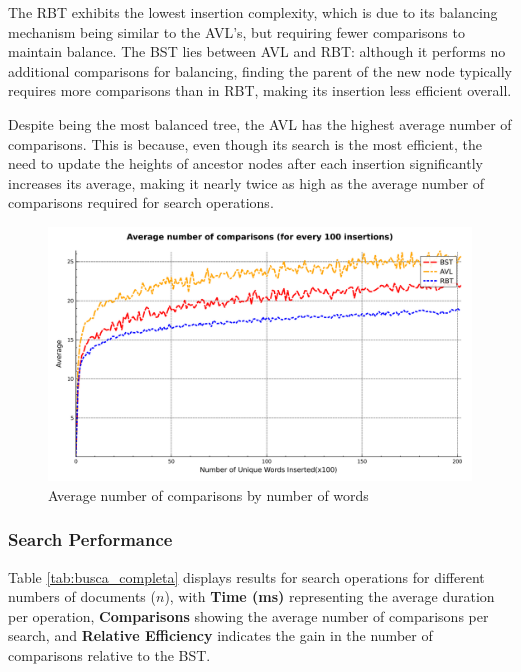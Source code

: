 The RBT exhibits the lowest insertion complexity, which is due to its balancing mechanism being similar to the AVL's, but requiring fewer comparisons to maintain balance. The BST lies between AVL and RBT: although it performs no additional comparisons for balancing, finding the parent of the new node typically requires more comparisons than in RBT, making its insertion less efficient overall.

Despite being the most balanced tree, the AVL has the highest average number of comparisons. This is because, even though its search is the most efficient, the need to update the heights of ancestor nodes after each insertion significantly increases its average, making it nearly twice as high as the average number of comparisons required for search operations.

\begin{figure}[H]
     \centering
     \includegraphics[width=0.8\linewidth]{img/Graph_3_20273.pdf}
     \caption{Average number of comparisons by number of words}
     \label{fig:mean-log}
\end{figure}


 \subsubsection{Search Performance}

 Table \ref{tab:busca_completa} displays results for search operations for different numbers
 of documents ($n$), with \textbf{Time (ms)}
 representing the average duration per operation, \textbf{Comparisons} showing the average number of comparisons per search,
 and \textbf{Relative Efficiency} indicates the gain in the number of comparisons relative to the BST.

